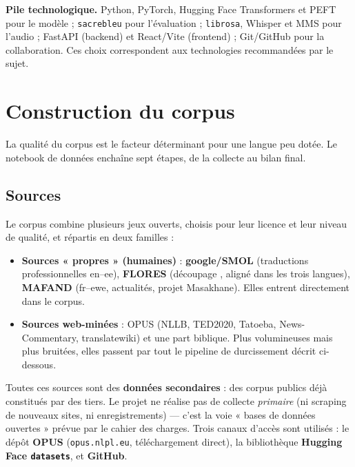 \documentclass[11pt,a4paper]{article}
\begin{document}
\begin{infobox}
\textbf{Pile technologique.} Python, PyTorch, Hugging Face Transformers et PEFT pour le
modèle ; \texttt{sacrebleu} pour l'évaluation ; \texttt{librosa}, Whisper et MMS pour
l'audio ; FastAPI (backend) et React/Vite (frontend) ; Git/GitHub pour la
collaboration. Ces choix correspondent aux technologies recommandées par le sujet.
\end{infobox}

\section{Construction du corpus}

La qualité du corpus est le facteur déterminant pour une langue peu dotée. Le notebook
de données enchaîne sept étapes, de la collecte au bilan final.

\subsection{Sources}
Le corpus combine plusieurs jeux ouverts, choisis pour leur licence et leur niveau de
qualité, et répartis en deux familles :

\begin{itemize}[leftmargin=1.5em,itemsep=3pt]
  \item \textbf{Sources « propres » (humaines)} : \textbf{google/SMOL} (traductions
        professionnelles en–ee), \textbf{FLORES} (découpage , aligné dans les
        trois langues), \textbf{MAFAND} (fr–ewe, actualités, projet Masakhane). Elles
        entrent directement dans le corpus.
  \item \textbf{Sources web-minées} : OPUS (NLLB, TED2020, Tatoeba, News-Commentary,
        translatewiki) et une part biblique. Plus volumineuses mais plus bruitées, elles
        passent par tout le pipeline de durcissement décrit ci-dessous.
\end{itemize}

Toutes ces sources sont des \textbf{données secondaires} : des corpus publics déjà
constitués par des tiers. Le projet ne réalise pas de collecte \emph{primaire} (ni
scraping de nouveaux sites, ni enregistrements) — c'est la voie « bases de données
ouvertes » prévue par le cahier des charges. Trois canaux d'accès sont utilisés : le
dépôt \textbf{OPUS} (\texttt{opus.nlpl.eu}, téléchargement direct), la bibliothèque
\textbf{Hugging Face \texttt{datasets}}, et \textbf{GitHub}.
\end{document}
